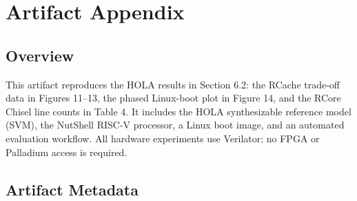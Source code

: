 \documentclass{sigplanconf}
\begin{document}



\appendix
\section{Artifact Appendix}

\subsection{Overview}

This artifact reproduces the HOLA results in Section 6.2: the RCache trade-off
data in Figures 11--13, the phased Linux-boot plot in Figure 14, and the RCore
Chisel line counts in Table 4. It includes the HOLA synthesizable reference
model (SVM), the NutShell RISC-V processor, a Linux boot image, and an automated
evaluation workflow. All hardware experiments use Verilator; no FPGA or
Palladium access is required.

\subsection{Artifact Metadata}
\end{document}
